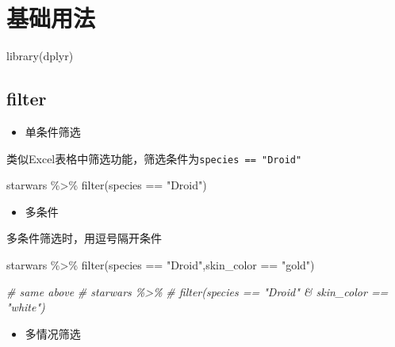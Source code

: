 \documentclass[
]{book}
\newenvironment{Shaded}{\begin{snugshade}}{\end{snugshade}}
\newcommand{\CommentTok}[1]{\textcolor[rgb]{0.56,0.35,0.01}{\textit{#1}}}
\newcommand{\FunctionTok}[1]{\textcolor[rgb]{0.00,0.00,0.00}{#1}}
\newcommand{\NormalTok}[1]{#1}
\newcommand{\SpecialCharTok}[1]{\textcolor[rgb]{0.00,0.00,0.00}{#1}}
\newcommand{\StringTok}[1]{\textcolor[rgb]{0.31,0.60,0.02}{#1}}
\providecommand{\tightlist}{%
  \setlength{\itemsep}{0pt}\setlength{\parskip}{0pt}}
\begin{document}
\hypertarget{ux57faux7840ux7528ux6cd5-2}{%
\section{基础用法}\label{ux57faux7840ux7528ux6cd5-2}}

\begin{Shaded}
\begin{Highlighting}[]
\FunctionTok{library}\NormalTok{(dplyr)}
\end{Highlighting}
\end{Shaded}

\hypertarget{filter}{%
\subsection{filter}\label{filter}}

\begin{itemize}
\tightlist
\item
  单条件筛选
\end{itemize}

类似Excel表格中筛选功能，筛选条件为\texttt{species\ ==\ "Droid"}

\begin{Shaded}
\begin{Highlighting}[]
\NormalTok{starwars }\SpecialCharTok{\%\textgreater{}\%} 
  \FunctionTok{filter}\NormalTok{(species }\SpecialCharTok{==} \StringTok{"Droid"}\NormalTok{)}
\end{Highlighting}
\end{Shaded}

\begin{itemize}
\tightlist
\item
  多条件
\end{itemize}

多条件筛选时，用逗号隔开条件

\begin{Shaded}
\begin{Highlighting}[]
\NormalTok{starwars }\SpecialCharTok{\%\textgreater{}\%} 
  \FunctionTok{filter}\NormalTok{(species }\SpecialCharTok{==} \StringTok{"Droid"}\NormalTok{,skin\_color }\SpecialCharTok{==} \StringTok{"gold"}\NormalTok{)}

\CommentTok{\# same above}
\CommentTok{\# starwars \%\textgreater{}\% }
\CommentTok{\#   filter(species == "Droid" \& skin\_color == "white")}
\end{Highlighting}
\end{Shaded}

\begin{itemize}
\tightlist
\item
  多情况筛选
\end{itemize}
\end{document}
